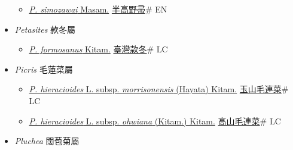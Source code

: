 \begin{itemize}
  \begin{itemize}
        \item[] \href{http://www.theplantlist.org/tpl1.1/search?q=Pertya+simozawai}{\textit{P. simozawai} Masam.}   \href{\detokenize{http://taibnet.sinica.edu.tw/chi/taibnet_species_list.php?T2=半高野帚&T2_new_value=true&fr=y}}{半高野帚}\# EN
  \end{itemize}
 \item[] \textit{Petasites} 款冬屬
                    
  \begin{itemize}
        \item[] \href{http://www.theplantlist.org/tpl1.1/search?q=Petasites+formosanus}{\textit{P. formosanus} Kitam.}   \href{\detokenize{http://taibnet.sinica.edu.tw/chi/taibnet_species_list.php?T2=臺灣款冬&T2_new_value=true&fr=y}}{臺灣款冬}\# LC
  \end{itemize}
 \item[] \textit{Picris} 毛蓮菜屬
                    
  \begin{itemize}
        \item[] \href{http://www.theplantlist.org/tpl1.1/search?q=Picris+hieracioides+subsp.+morrisonensis}{\textit{P. hieracioides} L. subsp. \textit{morrisonensis} (Hayata) Kitam.}   \href{\detokenize{http://taibnet.sinica.edu.tw/chi/taibnet_species_list.php?T2=玉山毛連菜&T2_new_value=true&fr=y}}{玉山毛連菜}\# LC
        \item[] \href{http://www.theplantlist.org/tpl1.1/search?q=Picris+hieracioides+subsp.+ohwiana}{\textit{P. hieracioides} L. subsp. \textit{ohwiana} (Kitam.) Kitam.}   \href{\detokenize{http://taibnet.sinica.edu.tw/chi/taibnet_species_list.php?T2=高山毛連菜&T2_new_value=true&fr=y}}{高山毛連菜}\# LC
  \end{itemize}
 \item[] \textit{Pluchea} 闊苞菊屬
                    

\end{itemize}
